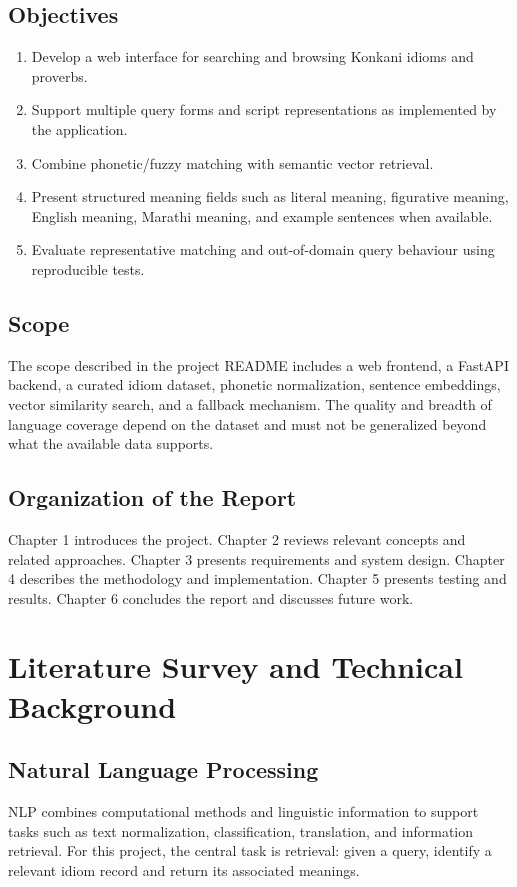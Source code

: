\documentclass[12pt,a4paper]{report}
\begin{document}
\section{Objectives}
\begin{enumerate}
    \item Develop a web interface for searching and browsing Konkani idioms and
          proverbs.
    \item Support multiple query forms and script representations as implemented
          by the application.
    \item Combine phonetic/fuzzy matching with semantic vector retrieval.
    \item Present structured meaning fields such as literal meaning, figurative
          meaning, English meaning, Marathi meaning, and example sentences when
          available.
    \item Evaluate representative matching and out-of-domain query behaviour using
          reproducible tests.
\end{enumerate}

\section{Scope}
The scope described in the project README includes a web frontend, a FastAPI
backend, a curated idiom dataset, phonetic normalization, sentence embeddings,
vector similarity search, and a fallback mechanism. The quality and breadth of
language coverage depend on the dataset and must not be generalized beyond what
the available data supports.

\section{Organization of the Report}
Chapter 1 introduces the project. Chapter 2 reviews relevant concepts and related
approaches. Chapter 3 presents requirements and system design. Chapter 4 describes
the methodology and implementation. Chapter 5 presents testing and results.
Chapter 6 concludes the report and discusses future work.

\chapter{Literature Survey and Technical Background}

\section{Natural Language Processing}
NLP combines computational methods and linguistic information to support tasks
such as text normalization, classification, translation, and information
retrieval. For this project, the central task is retrieval: given a query, identify
a relevant idiom record and return its associated meanings.
\end{document}
